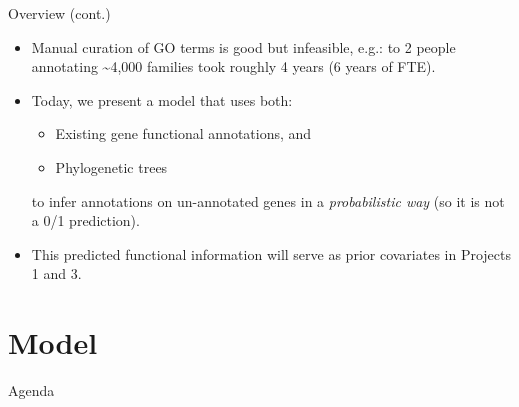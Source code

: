 \documentclass[9pt,ignorenonframetext,]{beamer}
\begin{document}
\begin{frame}{Overview (cont.)}

\begin{itemize}
\item
  Manual curation of GO terms is good but infeasible, e.g.:  to
  2 people annotating \textasciitilde{}4,000 families took roughly 4
  years (6 years of FTE).\pause
\item
  Today, we present a model that uses both: \pause

  \begin{itemize}
  \item
    Existing gene functional annotations, and
  \item
    Phylogenetic trees
  \end{itemize}

  to infer annotations on un-annotated genes in a \emph{probabilistic
  way} (so it is not a 0/1 prediction). \pause
\item
  This predicted functional information will serve as prior covariates
  in Projects 1 and 3.
\end{itemize}

\end{frame}

\section{Model}\label{model}

\begin{frame}[t]{Agenda}

\tableofcontents[currentsection]

\end{frame}
\end{document}
